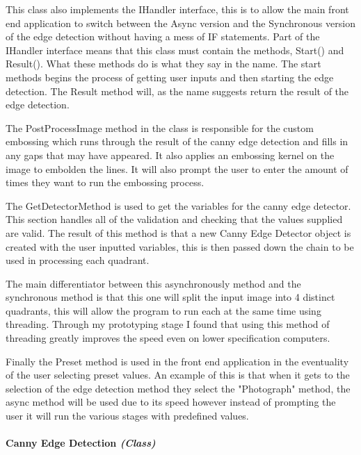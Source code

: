 \begin{FlushLeft}
    This class also implements the IHandler interface, this is to allow the main front end application to switch between the Async version and the Synchronous version of the edge detection without having a mess of IF statements. Part of the IHandler interface means that this class must contain the methods, Start() and Result(). What these methods do is what they say in the name. The start methods begins the process of getting user inputs and then starting the edge detection. The Result method will, as the name suggests return the result of the edge detection. \\ \bk

    The PostProcessImage method in the class is responsible for the custom embossing which runs through the result of the canny edge detection and fills in any gaps that may have appeared. It also applies an embossing kernel on the image to embolden the lines. It will also prompt the user to enter the amount of times they want to run the embossing process. \\ \bk
    
    The GetDetectorMethod is used to get the variables for the canny edge detector. This section handles all of the validation and checking that the values supplied are valid. The result of this method is that a new Canny Edge Detector object is created with the user inputted variables, this is then passed down the chain to be used in processing each quadrant. \\ \bk

    The main differentiator between this asynchronously method and the synchronous method is that this one will split the input image into 4 distinct quadrants, this will allow the program to run each at the same time using threading. Through my prototyping stage I found that using this method of threading greatly improves the speed even on lower specification computers. \\ \bk
    
    Finally the Preset method is used in the front end application in the eventuality of the user selecting preset values. An example of this is that when it gets to the selection of the edge detection method they select the "Photograph" method, the async method will be used due to its speed however instead of prompting the user it will run the various stages with predefined values. \\

    \bk
    \pagebreak
    \paragraph{Canny Edge Detection \textit{(Class)}} \mbox{} \\


\end{FlushLeft}
